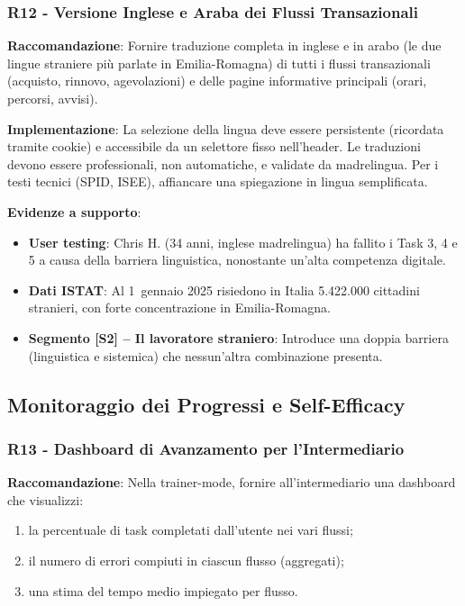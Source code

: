 ﻿\documentclass[11pt,a4paper]{article}
\begin{document}
\subsubsection{R12 - Versione Inglese e Araba dei Flussi Transazionali}
\label{rec:R12}

\textbf{Raccomandazione}: Fornire traduzione completa in inglese e in arabo
(le due lingue straniere pi\`u parlate in Emilia-Romagna) di tutti i flussi
transazionali (acquisto, rinnovo, agevolazioni) e delle pagine informative
principali (orari, percorsi, avvisi).

\textbf{Implementazione}: La selezione della lingua deve essere persistente
(ricordata tramite cookie) e accessibile da un selettore fisso nell'header.
Le traduzioni devono essere professionali, non automatiche, e validate da
madrelingua. Per i testi tecnici (SPID, ISEE), affiancare una spiegazione
in lingua semplificata.

\textbf{Evidenze a supporto}:
\begin{itemize}
    \item \textbf{User testing}: Chris H. (34 anni, inglese madrelingua) ha
    fallito i Task 3, 4 e 5 a causa della barriera linguistica, nonostante
    un'alta competenza digitale.
    \item \textbf{Dati ISTAT}: Al 1\textdegree\ gennaio 2025 risiedono in Italia 5.422.000
    cittadini stranieri, con forte concentrazione in Emilia-Romagna.
    \item \textbf{Segmento [S2] -- Il lavoratore straniero}: Introduce
    una doppia barriera (linguistica e sistemica) che nessun'altra
    combinazione presenta.
\end{itemize}




\subsection{Monitoraggio dei Progressi e Self-Efficacy}

\subsubsection{R13 - Dashboard di Avanzamento per l'Intermediario}
\label{rec:R13}

\textbf{Raccomandazione}: Nella trainer-mode, fornire all'intermediario una
dashboard che visualizzi:
\begin{enumerate}
    \item la percentuale di task completati dall'utente nei vari flussi;
    \item il numero di errori compiuti in ciascun flusso (aggregati);
    \item una stima del tempo medio impiegato per flusso.
\end{enumerate}
\end{document}
